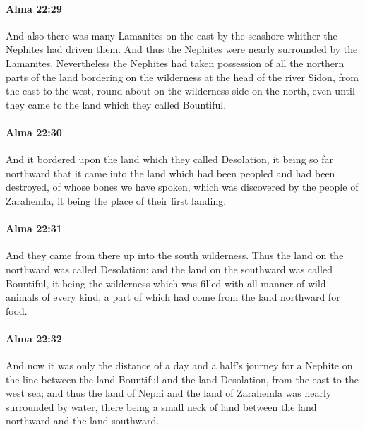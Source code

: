 		\paragraph{Alma 22:29} %
			\label{ALMA-22-29}

			And also there was many Lamanites on the east by the seashore
			whither the Nephites had driven them.
			And thus the Nephites were nearly surrounded by the Lamanites.
			Nevertheless the Nephites had taken possession of all the northern parts of the land
			bordering on the wilderness at the head of the river Sidon,
			from the east to the west, round about on the wilderness side on the north,
			even until they came to the land which they called Bountiful.

		\paragraph{Alma 22:30} %
			\label{ALMA-22-30}

			And it bordered upon the land which they called Desolation,
			it being so far northward that it came into the land
			which had been peopled and had been destroyed,
			of whose bones we have spoken,
			which was discovered by the people of Zarahemla,
			it being the place of their first landing.

		\paragraph{Alma 22:31} %
			\label{ALMA-22-31}

			And they came from there up into the south wilderness.
			Thus the land on the northward was called Desolation;
			and the land on the southward was called Bountiful,
			it being the wilderness which was filled
			with all manner of wild animals of every kind,
			a part of which had come from the land northward for food.

		\paragraph{Alma 22:32} %
			\label{ALMA-22-32}

			And now it was only the distance of a day and a half's journey for a Nephite
			on the line between the land Bountiful and the land Desolation,
			from the east to the west sea;
			and thus the land of Nephi and the land of Zarahemla
			was nearly surrounded by water,
			there being a small neck of land
			between the land northward and the land southward.

